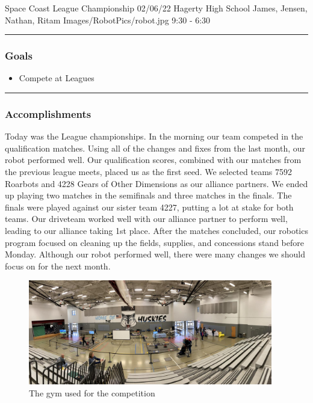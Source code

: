 \insertmeeting 
	{Space Coast League Championship} 
	{02/06/22} 
	{Hagerty High School}
	{James, Jensen, Nathan, Ritam}
	{Images/RobotPics/robot.jpg}
	{9:30 - 6:30}
	
\noindent\hfil\rule{\textwidth}{.4pt}\hfil
\subsubsection*{Goals}
\begin{itemize}
    \item Compete at Leagues

\end{itemize} 

\noindent\hfil\rule{\textwidth}{.4pt}\hfil

\subsubsection*{Accomplishments}
Today was the League championships. In the morning our team competed in the qualification matches. Using all of the changes and fixes from the last month, our robot performed well. Our qualification scores, combined with our matches from the previous league meets, placed us as the first seed. We selected teams 7592 Roarbots and 4228 Gears of Other Dimensions as our alliance partners. We ended up playing two matches in the semifinals and three matches in the finals. The finals were played against our sister team 4227, putting a lot at stake for both teams. Our driveteam worked well with our alliance partner to perform well, leading to our alliance taking 1st place. After the matches concluded, our robotics program focused on cleaning up the fields, supplies, and concessions stand before Monday. Although our robot performed well, there were many changes we should focus on for the next month. 


\begin{figure}[htp]
\centering
\includegraphics[width=0.95\textwidth, angle=0]{Meetings/February/02-06-22/02-06-22 1.jpg}
\caption{The gym used for the competition}
\label{fig:020622_1}
\end{figure}

